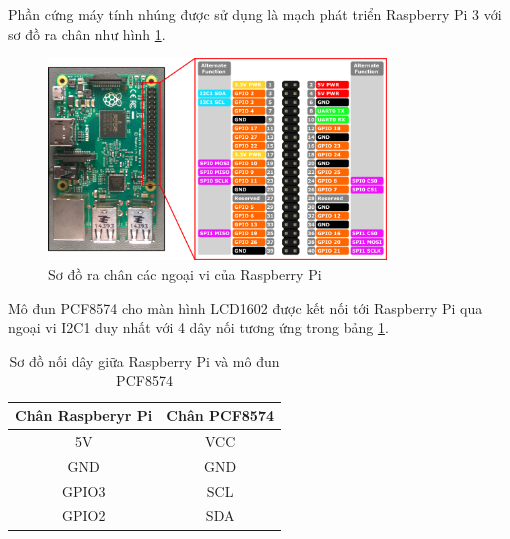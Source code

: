 Phần cứng máy tính nhúng được sử dụng là mạch phát triển Raspberry Pi 3 với sơ đồ ra chân như hình \ref{rpi3-pinout}. 
\begin{figure}[H]
	\centering
	\includegraphics[width=0.8\textwidth]{../images/rp3_pinout.png}
	\caption{Sơ đồ ra chân các ngoại vi của Raspberry Pi}
	\label{rpi3-pinout}
\end{figure}

Mô đun PCF8574 cho màn hình LCD1602 được kết nối tới Raspberry Pi qua ngoại vi I2C1 duy nhất với 4 dây nối tương ứng trong bảng \ref{wiring}.

\begin{table}[H]
	\centering
	\caption{Sơ đồ nối dây giữa Raspberry Pi và mô đun PCF8574}
	\begin{tabular}{|c|c|}
		\hline
		\textbf{Chân Raspberyr Pi} & \textbf{Chân PCF8574}\\
		\hline
		5V & VCC\\
		GND & GND\\
		GPIO3 & SCL\\
		GPIO2 & SDA\\
		\hline
	\end{tabular}
	\label{wiring}
\end{table}

